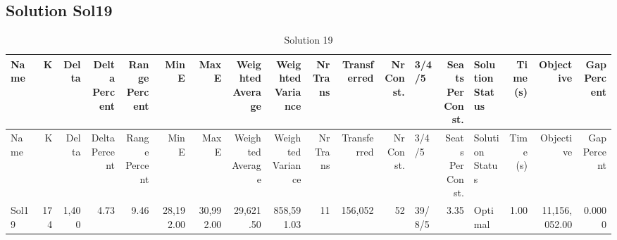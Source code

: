 \documentclass[a4paper]{article}
\begin{document}
\clearpage
\subsection{Solution Sol19}

{\scriptsize
\begin{longtable}{lrrrrrrrrrrrlrlrrr}
\caption{Solution 19}
\\ \toprule
Name &K &Delta &\shortstack{Delta\\Percent} &\shortstack{Range\\Percent} &Min E &Max E &\shortstack{Weighted\\Average} &\shortstack{Weighted\\Variance} &\shortstack{Nr\\Trans} &Transferred &\shortstack{Nr\\Const.} &3/4/5 &\shortstack{Seats\\Per\\Const.} &\shortstack{Solution\\Status} &\shortstack{Time\\(s)} &Objective &\shortstack{Gap\\Percent} \\ \midrule
\endfirsthead
\toprule
Name &K &Delta &\shortstack{Delta\\Percent} &\shortstack{Range\\Percent} &Min E &Max E &\shortstack{Weighted\\Average} &\shortstack{Weighted\\Variance} &\shortstack{Nr\\Trans} &Transferred &\shortstack{Nr\\Const.} &3/4/5 &\shortstack{Seats\\Per\\Const.} &\shortstack{Solution\\Status} &\shortstack{Time\\(s)} &Objective &\shortstack{Gap\\Percent} \\ \midrule
\endhead
\bottomrule
\endfoot
Sol19&174&1,400& 4.73& 9.46&28,192.00&30,992.00&29,621.50&858,591.03&11&156,052&52&39/8/5& 3.35&Optimal& 1.00&11,156,052.00&0.0000\\ 
\end{longtable}

}
\end{document}
